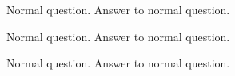 \documentclass{../../flashcards}
\begin{document}
\begin{card}{\blindtext[4]}
\blindtext[4]
\end{card}


\begin{card}{Normal question.}
Answer to normal question.
\end{card}


\begin{card}{\blindtext[4]}
\blindtext[4]
\end{card}


\begin{card}{Normal question.}
Answer to normal question.
\end{card}


\begin{card}{\blindtext[4]}
\blindtext[4]
\end{card}


\begin{card}{Normal question.}
Answer to normal question.
\end{card}


\begin{card}{\blindtext[4]}
\blindtext[4]
\end{card}


\begin{card}{\blindtext[4]}
\blindtext[4]
\end{card}


\begin{card}{\blindtext[4]}
\blindtext[4]
\end{card}


\begin{card}{\blindtext[4]}
\blindtext[4]
\end{card}


\begin{card}{\blindtext[4]}
\blindtext[4]
\end{card}


\begin{card}{\blindtext[4]}
\blindtext[4]
\end{card}


\begin{card}{\blindtext[4]}
\blindtext[4]
\end{card}


\begin{card}{\blindtext[4]}
\blindtext[4]
\end{card}


\begin{card}{\blindtext[4]}
\blindtext[4]
\end{card}
\end{document}
